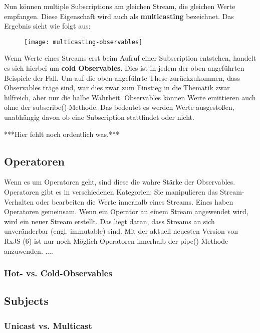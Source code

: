 \noindent
Nun können multiple Subscriptions am gleichen Stream, die gleichen Werte empfangen. Diese Eigenschaft wird auch als \textbf{multicasting} bezeichnet. Das Ergebnis sieht wie folgt aus:

\begin{figure}[H]
\begin{center}
\texttt{[image: multicasting-observables]}
\end{center}
\end{figure}

\noindent
Wenn Werte eines Streams erst beim Aufruf einer Subscription entstehen, handelt es sich hierbei um \textbf{cold Observables}.\cite{hot-vs-cold-observable} Dies ist in jedem der oben angeführten Beispiele der Fall. Um auf die oben angeführte These zurückzukommen, dass Observables träge sind, war dies zwar zum Einstieg in die Thematik zwar  hilfreich, aber nur die halbe Wahrheit. Observables können Werte emittieren auch ohne der subscribe()-Methode. Das bedeutet es werden Werte ausgestoßen, unabhängig davon ob eine Subscription stattfindet oder nicht. 



\noindent
\begin{center}
***Hier fehlt noch ordentlich was.*** 
\end{center}


\subsection{Operatoren}
Wenn es um Operatoren geht, sind diese die wahre Stärke der Observables. Operatoren gibt es in verschiedenen Kategorien: Sie manipulieren das Stream-Verhalten oder bearbeiten die Werte innerhalb eines Streams. Eines haben Operatoren gemeinsam. Wenn ein Operator an einem Stream angewendet wird, wird ein neuer Stream erstellt. Das liegt daran, dass Streams an sich unveränderbar (engl. immutable) sind.
Mit der aktuell neuesten Version von RxJS (6) ist nur noch Möglich Operatoren innerhalb der pipe() Methode anzuwenden.  ....

\subsubsection{Hot- vs. Cold-Observables}
\subsection{Subjects}
\subsubsection{Unicast vs. Multicast}









